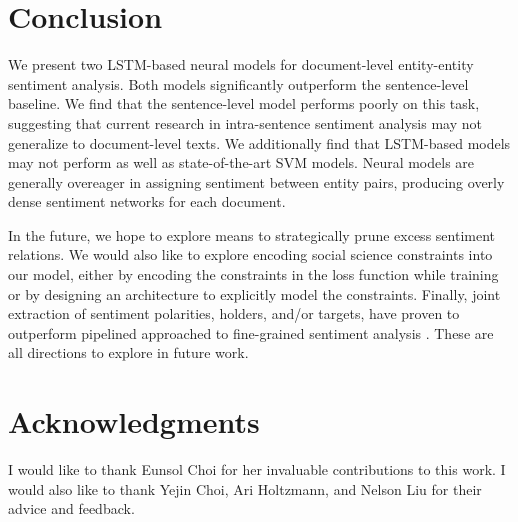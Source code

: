 \documentclass[11pt,a4paper]{article}
\begin{document}
\section{Conclusion}
We present two LSTM-based neural models for document-level entity-entity sentiment analysis. Both models significantly outperform the sentence-level baseline.
We find that the sentence-level model performs poorly on this task, suggesting that current research in intra-sentence sentiment analysis may not generalize to document-level texts.
We additionally find that LSTM-based models may not perform as well as state-of-the-art SVM models.
Neural models are generally overeager in assigning sentiment between entity pairs, producing overly dense sentiment networks for each document.
\par In the future, we hope to explore means to strategically prune excess sentiment relations.
We would also like to explore encoding social science constraints into our model, either by encoding the constraints in the loss function while training or by designing an architecture to explicitly model the constraints.
Finally, joint extraction of sentiment polarities, holders, and/or targets, have proven to outperform pipelined approached to fine-grained sentiment analysis \citep{Yang:13}.
These are all directions to explore in future work.

\section*{Acknowledgments}
I would like to thank Eunsol Choi for her invaluable contributions to this work.
I would also like to thank Yejin Choi, Ari Holtzmann, and Nelson Liu for their advice and feedback.




\appendix
\end{document}
